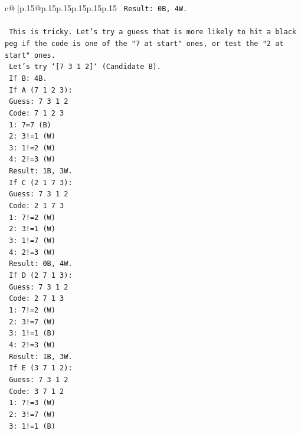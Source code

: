 \documentclass{article}
\begin{document}
{\begin{supertabular}{c@{$\;$}|p{.15\linewidth}@{}p{.15\linewidth}p{.15\linewidth}p{.15\linewidth}p{.15\linewidth}p{.15\linewidth}}
{{{\texttt{    Result: 0B, 4W.} \\
\\ 
\texttt{    This is tricky. Let's try a guess that is more likely to hit a black peg if the code is one of the "7 at start" ones, or test the "2 at start" ones.} \\
\texttt{    Let's try `{[}7 3 1 2{]}` (Candidate B).} \\
\texttt{    If B: 4B.} \\
\texttt{    If A (7 1 2 3):} \\
\texttt{       Guess: 7 3 1 2} \\
\texttt{       Code: 7 1 2 3} \\
\texttt{       1: 7=7 (B)} \\
\texttt{       2: 3!=1 (W)} \\
\texttt{       3: 1!=2 (W)} \\
\texttt{       4: 2!=3 (W)} \\
\texttt{       Result: 1B, 3W.} \\
\texttt{    If C (2 1 7 3):} \\
\texttt{       Guess: 7 3 1 2} \\
\texttt{       Code: 2 1 7 3} \\
\texttt{       1: 7!=2 (W)} \\
\texttt{       2: 3!=1 (W)} \\
\texttt{       3: 1!=7 (W)} \\
\texttt{       4: 2!=3 (W)} \\
\texttt{       Result: 0B, 4W.} \\
\texttt{    If D (2 7 1 3):} \\
\texttt{       Guess: 7 3 1 2} \\
\texttt{       Code: 2 7 1 3} \\
\texttt{       1: 7!=2 (W)} \\
\texttt{       2: 3!=7 (W)} \\
\texttt{       3: 1!=1 (B)} \\
\texttt{       4: 2!=3 (W)} \\
\texttt{       Result: 1B, 3W.} \\
\texttt{    If E (3 7 1 2):} \\
\texttt{       Guess: 7 3 1 2} \\
\texttt{       Code: 3 7 1 2} \\
\texttt{       1: 7!=3 (W)} \\
\texttt{       2: 3!=7 (W)} \\
\texttt{       3: 1!=1 (B)} \\
}}}
\end{supertabular}}
\end{document}
